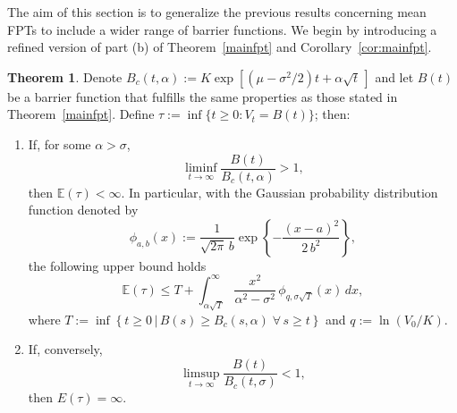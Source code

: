 \documentclass[12pt]{article}
\theoremstyle{definition}
\newtheorem{theorem}{Theorem}
\begin{document}
The aim of this section is to generalize the previous results concerning mean FPTs to include a wider range of barrier functions. We begin by introducing a refined version of part (b) of Theorem~\ref{mainfpt} and Corollary~\ref{cor:mainfpt}. 

\begin{theorem} 
\label{theor:second_fpt}
Denote $B_c(t,\alpha):=K \exp \left[(\mu-\sigma^2/2)t + \alpha \sqrt{t} \, \right]$ and let $B(t)$ be a barrier function that fulfills the same properties as those stated in Theorem~\ref{mainfpt}. Define $\tau := \inf \{t \ge 0 : V_t = B(t)\}$; then:
\begin{enumerate}[label=(\alph*)]
\item If, for some $\alpha>\sigma$,
$$
\liminf\limits_{t\rightarrow\infty}\dfrac{B(t)}{B_c(t,\alpha)} > 1,
$$
 then $\mathbb{E}(\tau)<\infty$. In particular, with the Gaussian probability distribution function denoted by
$$
\phi_{a,b}(x):=\frac{1}{\sqrt{2\pi} \, b}\exp \left\lbrace -\frac{(x-a)^2}{2 \, b^2} \right\rbrace,
$$
the following upper bound holds
\begin{equation}\nonumber
\mathbb{E}(\tau) \le T + \int_{\alpha\sqrt{T}}^\infty \frac{x^2}{\alpha^2 - \sigma^2} \, \phi_{q,\sigma\sqrt{T}}(x) \, dx,
\end{equation}
where $T:=\inf \left\lbrace t\geq 0 \, \big\vert \, B(s) \ge B_c(s,\alpha) \; \forall \, s \ge t \right\rbrace$ and $q:=\ln(V_0/K)$.
\item If, conversely, 
$$
\limsup\limits_{t\rightarrow\infty}\dfrac{B(t)}{B_c(t,\sigma)} < 1,
$$
then $E(\tau)=\infty$.
\end{enumerate}
\end{theorem}
\end{document}
